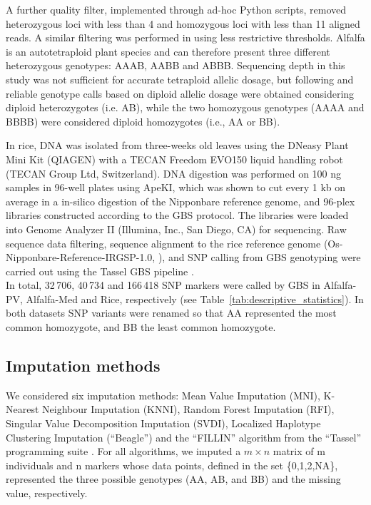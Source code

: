 A further quality filter, implemented through ad-hoc Python scripts, removed heterozygous loci with less than 4 and homozygous loci with less than 11 aligned reads. A similar filtering was performed in \cite{Rocher_validation_2015} using less restrictive thresholds. Alfalfa is an autotetraploid plant species and can therefore present three different heterozygous genotypes: AAAB, AABB and ABBB. Sequencing depth in this study was not sufficient for accurate tetraploid allelic dosage, but following \cite{li_saturated_2014} and \cite{li_genomic_2015} reliable genotype calls based on diploid allelic dosage were obtained considering diploid heterozygotes (i.e. AB), while the two homozygous genotypes (AAAA and BBBB) were considered diploid homozygotes (i.e., AA or BB).

In rice, DNA was isolated from three-weeks old leaves using the DNeasy Plant Mini Kit (QIAGEN) with a TECAN Freedom EVO150 liquid handling robot (TECAN Group Ltd, Switzerland). DNA digestion was performed on 100 ng samples in 96-well plates using ApeKI, which was shown to cut every 1 kb on average in a in-silico digestion of the Nipponbare reference genome, and 96-plex libraries constructed according to the GBS protocol. The libraries were loaded into Genome Analyzer II (Illumina, Inc., San Diego, CA) for sequencing. Raw sequence data filtering, sequence alignment to the rice reference genome (Os-Nipponbare-Reference-IRGSP-1.0, \cite{kawahara_improvement_2013}), and SNP calling from GBS genotyping were carried out using the Tassel GBS pipeline \cite{glaubitz_tassel-gbs:_2014}.\\
In total, 32\,706, 40\,734 and 166\,418 SNP markers were called by GBS in Alfalfa-PV, Alfalfa-Med and Rice, respectively (see Table~\ref{tab:descriptive_statistics}). In both datasets SNP variants were renamed so that AA represented the most common homozygote, and BB the least common homozygote.



\subsection{Imputation methods}
\label{sec:imputation_methods}
We considered six imputation methods: Mean Value Imputation (MNI), K-Nearest Neighbour Imputation (KNNI), Random Forest Imputation (RFI), Singular Value Decomposition Imputation (SVDI), Localized Haplotype Clustering Imputation (``Beagle'') and the ``FILLIN'' algorithm from the ``Tassel'' programming suite \cite{swarts_novel_2014}. For all algorithms, we imputed a $m\times n$ matrix of m individuals and n markers whose data points, defined in the set \{0,1,2,NA\}, represented the three possible genotypes (AA, AB, and BB) and the missing value, respectively. 
